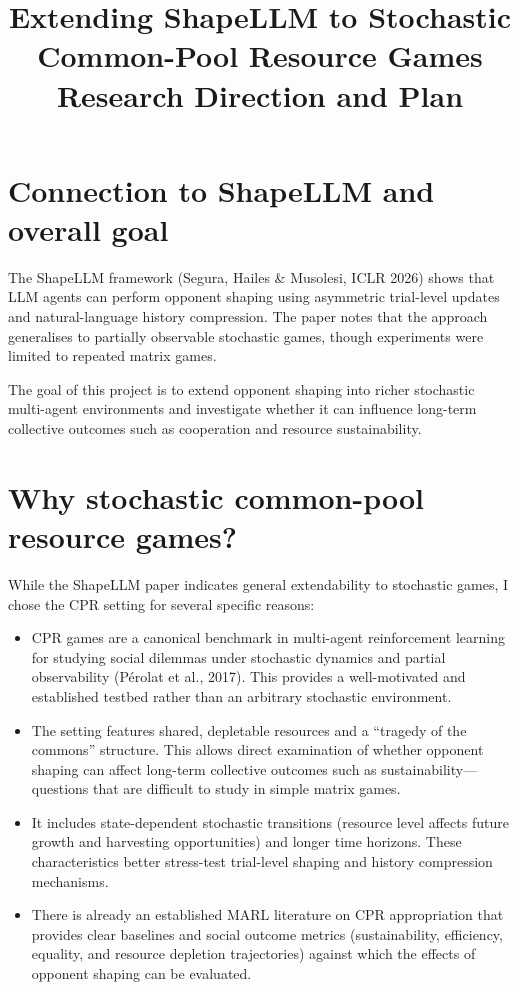 \documentclass[11pt,a4paper]{article}
\title{%
  Extending ShapeLLM to Stochastic\\
  Common-Pool Resource Games\\[0.5em]
  \large Research Direction and Plan
}
\author{}
\date{}
\begin{document}
\maketitle

\section{Connection to ShapeLLM and overall goal}

The ShapeLLM framework (Segura, Hailes \& Musolesi, ICLR 2026) shows that LLM agents can perform opponent shaping using asymmetric trial-level updates and natural-language history compression. The paper notes that the approach generalises to partially observable stochastic games, though experiments were limited to repeated matrix games.

The goal of this project is to extend opponent shaping into richer stochastic multi-agent environments and investigate whether it can influence long-term collective outcomes such as cooperation and resource sustainability.

\section{Why stochastic common-pool resource games?}

While the ShapeLLM paper indicates general extendability to stochastic games, I chose the CPR setting for several specific reasons:

\begin{itemize}[leftmargin=*, itemsep=0.35em]
  \item CPR games are a canonical benchmark in multi-agent reinforcement learning for studying social dilemmas under stochastic dynamics and partial observability (P\'{e}rolat et al., 2017). This provides a well-motivated and established testbed rather than an arbitrary stochastic environment.
  \item The setting features shared, depletable resources and a ``tragedy of the commons'' structure. This allows direct examination of whether opponent shaping can affect long-term collective outcomes such as sustainability---questions that are difficult to study in simple matrix games.
  \item It includes state-dependent stochastic transitions (resource level affects future growth and harvesting opportunities) and longer time horizons. These characteristics better stress-test trial-level shaping and history compression mechanisms.
  \item There is already an established MARL literature on CPR appropriation that provides clear baselines and social outcome metrics (sustainability, efficiency, equality, and resource depletion trajectories) against which the effects of opponent shaping can be evaluated.
\end{itemize}
\end{document}
